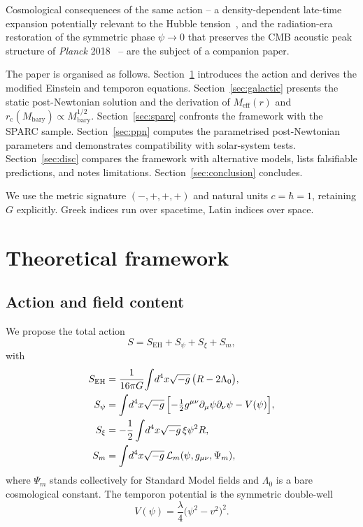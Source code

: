\documentclass[%
    aps,
    prd,
    reprint,
    superscriptaddress,
    nofootinbib,
    floatfix,
    amsmath,amssymb,
]{revtex4-2}
\newcommand{\Meff}{M_{\mathrm{eff}}}
\newcommand{\Mbary}{M_{\mathrm{bary}}}
\newcommand{\rc}{r_{\mathrm{c}}}
\begin{document}
Cosmological consequences of the same action -- a
density-dependent late-time expansion potentially relevant to the
Hubble tension~\cite{Riess2022}, and the radiation-era
restoration of the symmetric phase $\psi\!\to\!0$ that preserves
the CMB acoustic peak structure of \emph{Planck}
2018~\cite{Planck2020} -- are the subject of a companion paper.

The paper is organised as follows. Section~\ref{sec:framework}
introduces the action and derives the modified Einstein and
temporon equations. Section~\ref{sec:galactic} presents the
static post-Newtonian solution and the derivation of $\Meff(r)$
and $\rc(\Mbary)\propto\Mbary^{1/2}$. Section~\ref{sec:sparc}
confronts the framework with the SPARC sample.
Section~\ref{sec:ppn} computes the parametrised post-Newtonian
parameters and demonstrates compatibility with solar-system
tests. Section~\ref{sec:disc} compares the framework
with alternative models, lists falsifiable predictions, and
notes limitations. Section~\ref{sec:conclusion} concludes.

We use the metric signature $(-,+,+,+)$ and natural units
$c=\hbar=1$, retaining $G$ explicitly. Greek indices run over
spacetime, Latin indices over space.

\section{Theoretical framework}
\label{sec:framework}

\subsection{Action and field content}

We propose the total action
\begin{equation}
\label{eq:action}
S = S_{\mathrm{EH}} + S_{\psi} + S_{\xi} + S_{m},
\end{equation}
with
\begin{align}
S_{\mathrm{EH}} &= \frac{1}{16\pi G}\!\int\! d^{4}x\sqrt{-g}\,
                 \bigl(R - 2\Lambda_{0}\bigr), \\
S_{\psi} &= \int\! d^{4}x\sqrt{-g}\,
            \Bigl[-\tfrac{1}{2}g^{\mu\nu}\partial_{\mu}\psi\partial_{\nu}\psi - V(\psi)\Bigr], \\
S_{\xi} &= -\frac{1}{2}\int\! d^{4}x\sqrt{-g}\,\xi\psi^{2}R, \\
S_{m}   &= \int\! d^{4}x\sqrt{-g}\,\mathcal{L}_{m}(\psi,g_{\mu\nu},\Psi_{m}),
\end{align}
where $\Psi_{m}$ stands collectively for Standard Model fields
and $\Lambda_{0}$ is a bare cosmological constant. The temporon
potential is the symmetric double-well
\begin{equation}
\label{eq:potential}
V(\psi) = \frac{\lambda}{4}\bigl(\psi^{2} - v^{2}\bigr)^{2}.
\end{equation}
\end{document}
